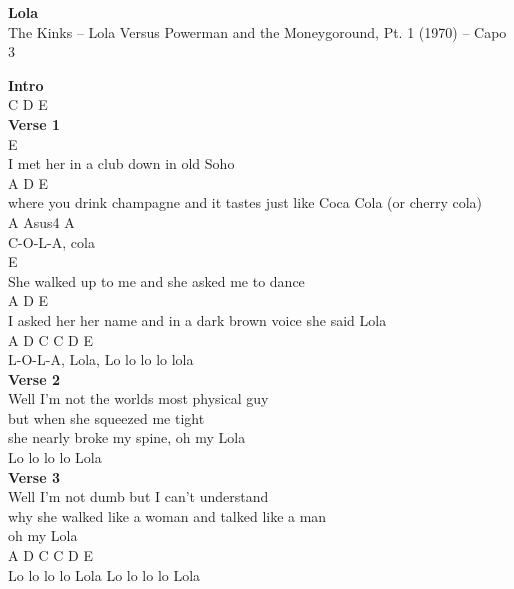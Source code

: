 \documentclass[a4paper]{article}
\begin{document}
    \begin{center}
        \textbf{Lola}
        ~\\
        The Kinks -- Lola Versus Powerman and the Moneygoround, Pt. 1 (1970)
         -- Capo 3
    \end{center}
    {
        \scriptsize
        \textbf{Intro}
        ~\\
        {
            \cutive
            \obeyspaces
C  D E
\\

        }
        \textbf{Verse 1}
        ~\\
        {
            \cutive
            \obeyspaces
  E
\\
I met her in a club down in old Soho
\\
          A                      D                     E
\\
where you drink champagne and it tastes just like Coca Cola (or cherry cola)
\\
         A   Asus4 A
\\
C-O-L-A, cola
\\
    E
\\
She walked up to me and she asked me to dance
\\
  A                           D                         E
\\
I asked her her name and in a dark brown voice she said Lola
\\
         A    D             C   C  D  E
\\
L-O-L-A, Lola,  Lo lo lo lo lola
\\

        }
        \textbf{Verse 2}
        ~\\
        {
            \cutive
            \obeyspaces
Well I'm not the worlds most physical guy
\\
but when she squeezed me tight
\\
she nearly broke my spine, oh my Lola
\\
Lo lo lo lo Lola
\\

        }
        \textbf{Verse 3}
        ~\\
        {
            \cutive
            \obeyspaces
Well I'm not dumb but I can't understand
\\
why she walked like a woman and talked like a man
\\
oh my Lola
\\
            A    D             C    C D  E
\\
Lo lo lo lo Lola   Lo lo lo lo Lola
\\

}}
\end{document}
